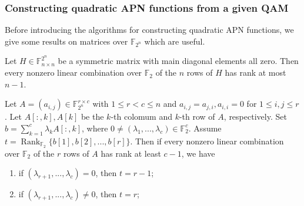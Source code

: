 \documentclass[
    aspectratio=169,                   %
]{beamer}
\newcommand{\F}{\mathbb{F}}
\begin{document}
    \begin{frame}
        \frametitle{Constructing quadratic APN functions from a given QAM}
        
        Before introducing the algorithms for constructing quadratic APN functions, we give some results on 
        matrices over $ \F_{2^n} $ which are useful.

        \begin{lemma}
            Let $ H \in\F_{n\times n}^{2^n} $  be a symmetric matrix with main diagonal elements all zero. 
            Then every nonzero linear combination over $\F_2$ of the $n$ rows of $H$ has rank at most $n − 1$.
        \end{lemma}
        \begin{theorem}
            Let $ A=(a_{i,j})\in\F_{2^n}^{r\times c} $ with $ 1\le r<c\le n $ and $ a_{i,j}=a_{j,i},a_{i,i}=0 $
            for $ 1\le i,j\le r $. 
            Let $ A[:,k],A[k] $ be the $ k $-th colomum and $ k $-th row of $ A $, respectively. 
            Set $ b=\sum_{k=1}^{c}\lambda_kA[:,k] $, where $ 0\ne (\lambda_1,...,\lambda_c)\in\F_2^c $. 
            Assume $ t=\operatorname{Rank}_{\F_2}\{b[1],b[2],...,b[r]\} $. Then if every nonzero linear combination 
            over $\F_2$ of the $r$ rows of $A$ has rank at least $c − 1$, we have 
            \begin{enumerate}
                \item if $ (\lambda_{r+1},...,\lambda_c)=0  $, then $ t=r-1 $;
                \item if $ (\lambda_{r+1},...,\lambda_c)\ne 0  $, then $ t=r $;
            \end{enumerate}
        \end{theorem}
    \end{frame}
    
\end{document}
